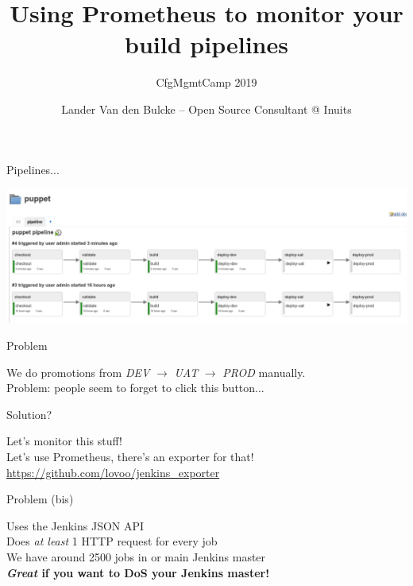 \documentclass[aspectratio=169,12pt]{beamer}
\title{Using Prometheus to monitor your build pipelines}
\subtitle{CfgMgmtCamp 2019}
\author{Lander Van den Bulcke -- Open Source Consultant @ Inuits}
\date{}
\institute{landervdb @ \{twitter,github,freenode\}}
\begin{document}
\maketitle

\begin{frame}{Pipelines...}
  \begin{center}
    \includegraphics[width=\textwidth]{img/pipeline.png}
  \end{center}
\end{frame}

\begin{frame}[fragile]{Problem}
  \begin{center}
    We do promotions from \textit{DEV} $\rightarrow$ \textit{UAT} $\rightarrow$ \textit{PROD} manually. \\
    \vspace{20pt}
    Problem: people seem to forget to click this button...
  \end{center}
\end{frame}

\begin{frame}[fragile]{Solution?}
  \begin{center}
    Let's monitor this stuff! \\
    \vspace{20pt}
    Let's use Prometheus, there's an exporter for that! \\
    \vspace{20pt}
    \url{https://github.com/lovoo/jenkins_exporter}
  \end{center}
\end{frame}

\begin{frame}[fragile]{Problem (bis)}
  \begin{center}
    Uses the Jenkins JSON API \\
    \vspace{20pt}
    Does \textit{at least} 1 HTTP request for every job \\
    \vspace{20pt}
    We have around 2500 jobs in or main Jenkins master \\
    \vspace{20pt}
    \textbf{\textit{Great} if you want to DoS your Jenkins master!}
  \end{center}
\end{frame}
\end{document}
